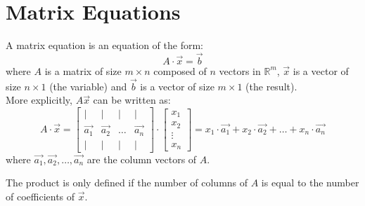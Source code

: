 \section{Matrix Equations}
\begin{definition}
    A matrix equation is an equation of the form:
    \[
        A \cdot \vec{x} = \vec{b}
    \]
    where $A$ is a matrix of size $m \times n$ composed of $n$ vectors in $\mathbb{R}^m$, $\vec{x}$ is a vector of size $n \times 1$ (the variable) and $\vec{b}$ is a vector of size $m \times 1$ (the result). \\
    More explicitly, $A \vec{x}$ can be written as:
    \[
        A \cdot \vec{x} = \begin{bmatrix} | & | & | & | \\ \vec{a_1} & \vec{a_2} & \ldots & \vec{a_n} \\ | & | & | & | \end{bmatrix} \cdot \begin{bmatrix} x_1 \\ x_2 \\ \vdots \\ x_n \end{bmatrix} = x_1 \cdot \vec{a_1} + x_2 \cdot \vec{a_2} + \ldots + x_n \cdot \vec{a_n}
    \]
    where $\vec{a_1}, \vec{a_2}, \ldots, \vec{a_n}$ are the column vectors of $A$.
\end{definition}
The product is only defined if the number of columns of $A$ is equal to the number of coefficients of $\vec{x}$.

